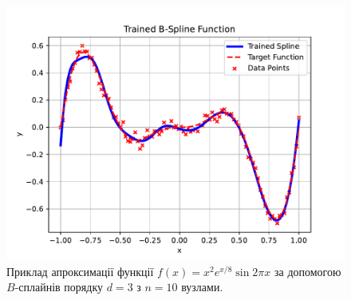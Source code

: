 \begin{figure}
    \centering
    \includegraphics[width=0.8\linewidth]{figures/trained_spline.pdf}
    \caption{Приклад апроксимації функції $f(x) = x^2e^{x/8} \sin 2\pi x$ за
    допомогою $B$-сплайнів порядку $d=3$ з $n=10$ вузлами.}
    \label{fig:bspline_approx}
\end{figure}

